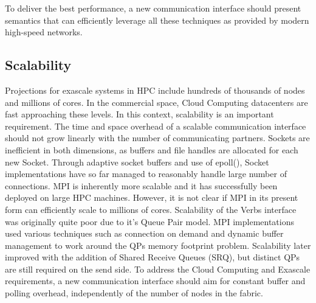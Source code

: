 \documentclass[conference]{IEEEtran}
\begin{document}
To deliver the best performance, a new communication interface should present
semantics that can efficiently leverage all these techniques as provided by 
modern high-speed networks.

\subsection{Scalability}
Projections for exascale systems in HPC include hundreds of thousands of nodes 
and millions of cores\cite{dongarra:exascale-talk-2010}. In the commercial 
space, Cloud Computing datacenters are fast approaching these levels. 
In this context, scalability is an important requirement. The time and space 
overhead of a scalable communication interface should not grow linearly with 
the number of communicating partners. Sockets are inefficient in both 
dimensions, as buffers and file handles are allocated for each new Socket. 
Through adaptive socket buffers and use of epoll(), Socket implementations 
have so far managed to reasonably handle large number of connections. 
MPI is inherently more scalable and it has successfully been deployed on large 
HPC machines. However, it is not clear if MPI in its present form can 
efficiently scale to millions of cores. 
Scalability of the Verbs interface was originally quite poor due to it's Queue 
Pair model. MPI implementations used various techniques such as connection on 
demand\cite{connect-on-demand} and dynamic buffer management\cite{dynamic-buffer} 
to work around the QPs memory footprint problem. Scalability later improved 
with the addition of Shared Receive Queues (SRQ), but distinct QPs are still 
required on the send side. To address the Cloud Computing and Exascale 
requirements, a new communication interface should aim for constant buffer 
and polling overhead, independently of the number of nodes in the fabric.
\end{document}
